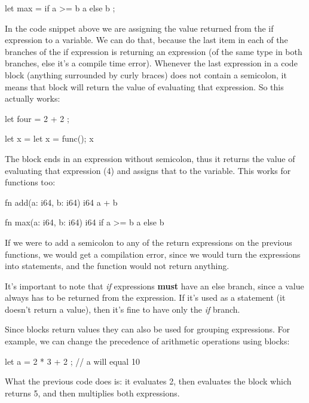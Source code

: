﻿\documentclass[10pt,a4paper,twocolumn,twoside]{article}
\begin{document}
\begin{code}
    let max = if a >= b { a } else { b };
\end{code}

In the code snippet above we are assigning the value returned from the if
expression to a variable. We can do that, because the last item in each of the
branches of the if expression is returning an expression (of the same type in
both branches, else it's a compile time error). Whenever the last expression in
a code block (anything surrounded by curly braces) does not contain a semicolon,
it means that block will return the value of evaluating that expression. So this
actually works: 

\begin{code}
    let four = {
        2 + 2
    };

    let x = {
        let x = func();
        x
    }
\end{code}

The block ends in an expression without semicolon, thus it returns the value of
evaluating that expression (4) and assigns that to the variable. This works for 
functions too:

\begin{code}
    fn add(a: i64, b: i64) i64 {
        a + b
    }

    fn max(a: i64, b: i64) i64 {
        if a >= b { a } else { b }
    }
\end{code}

If we were to add a semicolon to any of the return expressions on the previous
functions, we would get a compilation error, since we would turn the expressions
into statements, and the function would not return anything.

It's important to note that \textit{if} expressions \textbf{must} have an else
branch, since a value always has to be returned from the expression. If it's 
used as a statement (it doesn't return a value), then it's fine to have only the
\textit{if} branch.

Since blocks return values they can also be used for grouping expressions. For
example, we can change the precedence of arithmetic operations using blocks:

\begin{code}
    let a =  2 * { 3 + 2 }; // a will equal 10
\end{code}

What the previous code does is: it evaluates 2, then evaluates the block which
returns 5, and then multiplies both expressions.
\end{document}
